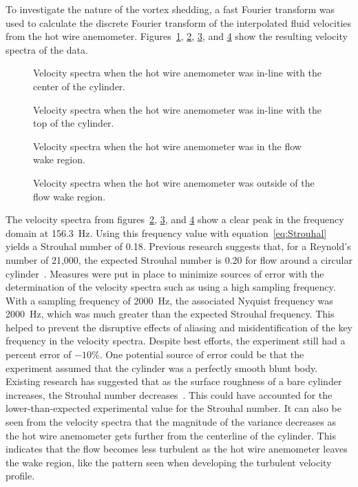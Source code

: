 \documentclass[journal,letterpaper]{IEEEtran}
\begin{document}
To investigate the nature of the vortex shedding, a fast Fourier transform was used to calculate the discrete Fourier transform of the interpolated fluid velocities from the hot wire anemometer. Figures~\ref{fig:freq2}, \ref{fig:freq3}, \ref{fig:freq4}, and \ref{fig:freq5} show the resulting velocity spectra of the data.

\begin{figure}[H]
    \centering
    \caption{Velocity spectra when the hot wire anemometer was in-line with the center of the cylinder.}
    \label{fig:freq2}
\end{figure}

\begin{figure}[H]
    \centering
    \caption{Velocity spectra when the hot wire anemometer was in-line with the top of the cylinder.}
    \label{fig:freq3}
\end{figure}

\begin{figure}[H]
    \centering
    \caption{Velocity spectra when the hot wire anemometer was in the flow wake region.}
    \label{fig:freq4}
\end{figure}

\begin{figure}[H]
    \centering
    \caption{Velocity spectra when the hot wire anemometer was outside of the flow wake region.}
    \label{fig:freq5}
\end{figure}


The velocity spectra from figures~\ref{fig:freq3}, \ref{fig:freq4}, and \ref{fig:freq5} show a clear peak in the frequency domain at \qty{156.3}{\hertz}.
Using this frequency value with equation~\eqref{eq:Strouhal} yields a Strouhal number of 0.18.
Previous research suggests that, for a Reynold's number of 21,000, the expected Strouhal number is 0.20 for flow around a circular cylinder~\cite{Strouhal}.
Measures were put in place to minimize sources of error with the determination of the velocity spectra such as using a high sampling frequency.
With a sampling frequency of \qty{2000}{\hertz}, the associated Nyquist frequency was \qty{2000}{\hertz}, which was much greater than the expected Strouhal frequency.
This helped to prevent the disruptive effects of aliasing and misidentification of the key frequency in the velocity spectra.
Despite best efforts, the experiment still had a percent error of $-10$\%.
One potential source of error could be that the experiment assumed that the cylinder was a perfectly smooth blunt body.
Existing research has suggested that as the surface roughness of a bare cylinder increases, the Strouhal number decreases~\cite{roughness}.
This could have accounted for the lower-than-expected experimental value for the Strouhal number.
It can also be seen from the velocity spectra that the magnitude of the variance decreases as the hot wire anemometer gets further from the centerline of the cylinder.
This indicates that the flow becomes less turbulent as the hot wire anemometer leaves the wake region, like the pattern seen when developing the turbulent velocity profile.
\end{document}

